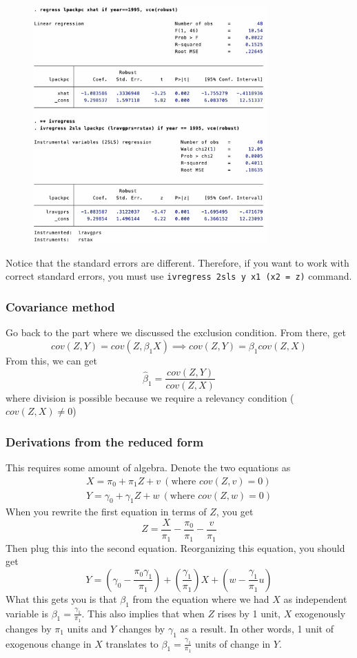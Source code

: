 \documentclass[12pt]{article}
\theoremstyle{definition}
\theoremstyle{property}
\theoremstyle{assumption}
\theoremstyle{example}
\theoremstyle{comment}
\begin{document}
\begin{figure}[H]
\centering
\includegraphics[width=0.8\textwidth,keepaspectratio]{ivregress.png}
\end{figure}
Notice that the standard errors are different. Therefore, if you want to work with correct standard errors, you must use \texttt{ivregress 2sls y x1 (x2 = z)} command.
\subsubsection{Covariance method}
Go back to the part where we discussed the exclusion condition. From there, get
\[
cov(Z,Y)=cov(Z,\beta_1X) \implies cov(Z,Y)=\beta_1cov(Z,X)
\]
From this, we can get
\[
\hat{\beta}_1=\frac{cov(Z,Y)}{cov(Z,X)}
\]
where division is possible because we require a relevancy condition ($cov(Z,X)\neq0$)
\subsubsection{Derivations from the reduced form}
This requires some amount of algebra. Denote the two equations as
\begin{gather*}
X=\pi_0+\pi_1Z+v \ (\text{where }cov(Z,v)=0)\\ Y=\gamma_0+\gamma_1Z+w \ (\text{where }cov(Z,w)=0)
\end{gather*}
When you rewrite the first equation in terms of $Z$, you get
\[
Z=\frac{X}{\pi_1}-\frac{\pi_0}{\pi_1}-\frac{v}{\pi_1}
\]
Then plug this into the second equation. Reorganizing this equation, you should get
\[
Y=\left(\gamma_0-\frac{\pi_0\gamma_1}{\pi_1}\right)+\left(\frac{\gamma_1}{\pi_1}\right)X+\left(w-\frac{\gamma_1}{\pi_1}u\right)
\]
What this gets you is that $\beta_1$ from the equation where we had $X$ as independent variable is $\beta_1 = \frac{\gamma_1}{\pi_1}$. This also implies that when $Z$ rises by 1 unit, $X$ exogenously changes by $\pi_1$ units and $Y$ changes by $\gamma_1$ as a result. In other words, 1 unit of exogenous change in $X$ translates to  $\beta_1 = \frac{\gamma_1}{\pi_1}$ units of change in $Y$. \par\medskip
\end{document}
